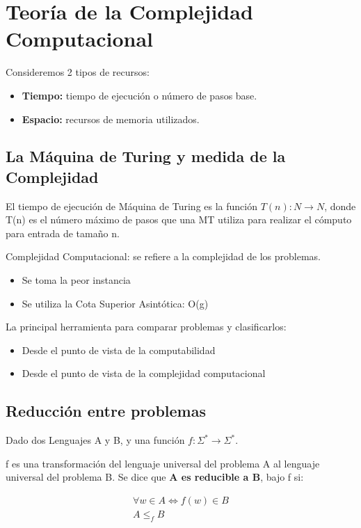 \chapter{Teoría de la Complejidad Computacional}\label{ch:teoría-de-la-complejidad-computacional}
Consideremos 2 tipos de recursos:
\begin{itemize}
  \item \textbf{Tiempo:} tiempo de ejecución o número de pasos base.
  \item \textbf{Espacio:} recursos de memoria utilizados.
\end{itemize}

\section{La Máquina de Turing y medida de la Complejidad}
El tiempo de ejecución de Máquina de Turing es la función $T(n): N \rightarrow N$, donde T(n) es el número máximo de pasos que una MT utiliza para realizar el cómputo para entrada de tamaño n.

Complejidad Computacional: se refiere a la complejidad de los problemas.
\begin{itemize}
  \item Se toma la peor instancia
  \item Se utiliza la Cota Superior  Asintótica: O(g)
\end{itemize}

La principal herramienta para comparar problemas y clasificarlos:
\begin{itemize}
  \item Desde el punto de vista de la computabilidad
  \item Desde el punto de vista de la complejidad computacional
\end{itemize} 

\section{Reducción entre problemas}
Dado dos Lenguajes A y B, y una función $f: \Sigma^* \rightarrow \Sigma^*$.

f es una transformación del lenguaje universal del problema A al lenguaje universal del problema B. Se dice que \textbf{A es reducible a B}, bajo f si:

$$\begin{matrix}
  \forall w \in A \Leftrightarrow f(w)\in B \\ 
  A \leq_f B
\end{matrix}$$

